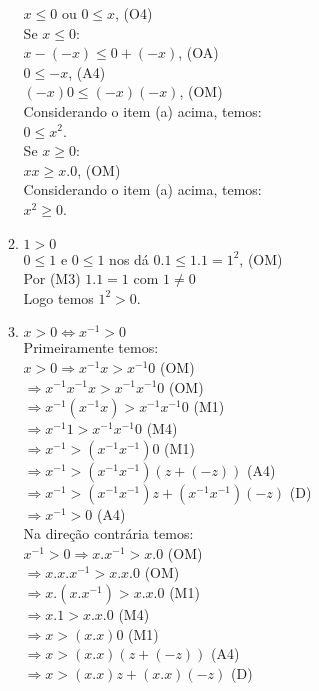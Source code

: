 \begin{enumerate}
\begin{enumerate}
			$x \leq 0$ ou $0 \leq x$, (O4)\\
			Se $x \leq 0$:\\
			$x - (-x) \leq 0 + (-x)$, (OA)\\
			$0 \leq -x$, (A4)\\
			$(-x)0 \leq (-x)(-x)$, (OM)\\
			Considerando o item (a) acima, temos:\\
			$0 \leq x^2$.\\
			Se $x \geq 0$:\\
			$xx \geq x.0$, (OM)\\
			Considerando o item (a) acima, temos:\\
			$x^2 \geq 0$.			
			\item %
			$1 > 0$\\
			$0 \leq 1$ e $0 \leq 1$ nos dá $0.1 \leq 1.1 = 1^2$, (OM)\\
			Por (M3) $1.1 = 1$ com $1 \neq 0$\\
			Logo temos $1^2 > 0$.
			\item %
			$x > 0 \Leftrightarrow x^{-1} > 0$\\
			Primeiramente temos:\\
			$x > 0 \Rightarrow x^{-1}x > x^{-1}0 $ (OM)\\
			$\Rightarrow x^{-1}x^{-1}x > x^{-1}x^{-1}0$ (OM)\\
			$\Rightarrow x^{-1}(x^{-1}x) > x^{-1}x^{-1}0$ (M1)\\
			$\Rightarrow x^{-1}1 >x^{-1}x^{-1}0$ (M4)\\
			$\Rightarrow x^{-1} > (x^{-1}x^{-1})0$ (M1)\\
			$\Rightarrow x^{-1} > (x^{-1}x^{-1})(z+(-z))$ (A4)\\
			$\Rightarrow x^{-1} > (x^{-1}x^{-1})z + (x^{-1}x^{-1})(-z)$ (D)\\
			$\Rightarrow x^{-1} > 0$  (A4)\\
			Na direção contrária temos:\\
			$x^{-1} > 0 \Rightarrow x.x^{-1} > x.0 $ (OM)\\
			$\Rightarrow x.x.x^{-1} > x.x.0$ (OM)\\
			$\Rightarrow x.(x.x^{-1}) > x.x.0$ (M1)\\
			$\Rightarrow x.1 >x.x.0$ (M4)\\
			$\Rightarrow x > (x.x)0$ (M1)\\
			$\Rightarrow x > (x.x)(z+(-z))$ (A4)\\
			$\Rightarrow x > (x.x)z + (x.x)(-z)$ (D)\\

\end{enumerate}
\end{enumerate}
